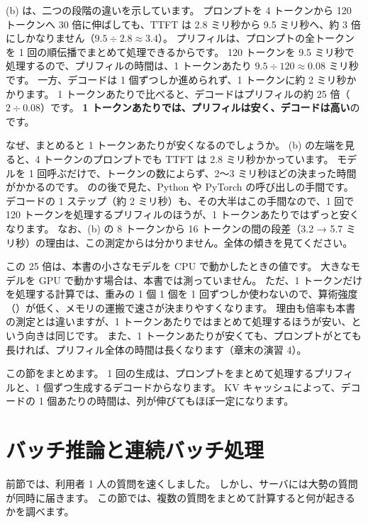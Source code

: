 (b) は、二つの段階の違いを示しています。
プロンプトを 4 トークンから 120 トークンへ 30 倍に伸ばしても、TTFT は 2.8 ミリ秒から 9.5 ミリ秒へ、約 3 倍にしかなりません（$9.5\div2.8\approx3.4$）。
プリフィルは、プロンプトの全トークンを 1 回の順伝播でまとめて処理できるからです。
120 トークンを 9.5 ミリ秒で処理するので、プリフィルの時間は、1 トークンあたり $9.5\div120\approx0.08$ ミリ秒です。
一方、デコードは 1 個ずつしか進められず、1 トークンに約 2 ミリ秒かかります。
1 トークンあたりで比べると、デコードはプリフィルの約 25 倍（$2\div0.08$）です。
\textbf{1 トークンあたりでは、プリフィルは安く、デコードは高い}のです。

なぜ、まとめると 1 トークンあたりが安くなるのでしょうか。
(b) の左端を見ると、4 トークンのプロンプトでも TTFT は 2.8 ミリ秒かかっています。
モデルを 1 回呼ぶだけで、トークンの数によらず、2〜3 ミリ秒ほどの決まった時間がかかるのです。
のの後で見た、Python や PyTorch の呼び出しの手間です。
デコードの 1 ステップ（約 2 ミリ秒）も、その大半はこの手間なので、1 回で 120 トークンを処理するプリフィルのほうが、1 トークンあたりではずっと安くなります。
なお、(b) の 8 トークンから 16 トークンの間の段差（3.2 → 5.7 ミリ秒）の理由は、この測定からは分かりません。全体の傾きを見てください。

この 25 倍は、本書の小さなモデルを CPU で動かしたときの値です。
大きなモデルを GPU で動かす場合は、本書では測っていません。
ただ、1 トークンだけを処理する計算では、重みの 1 個 1 個を 1 回ずつしか使わないので、算術強度（）が低く、メモリの運搬で速さが決まりやすくなります。
理由も倍率も本書の測定とは違いますが、1 トークンあたりではまとめて処理するほうが安い、という向きは同じです。
また、1 トークンあたりが安くても、プロンプトがとても長ければ、プリフィル全体の時間は長くなります（章末の演習 4）。

この節をまとめます。
1 回の生成は、プロンプトをまとめて処理するプリフィルと、1 個ずつ生成するデコードからなります。
KV キャッシュによって、デコードの 1 個あたりの時間は、列が伸びてもほぼ一定になります。

\section{バッチ推論と連続バッチ処理}\label{sec:es-batch}

前節では、利用者 1 人の質問を速くしました。
しかし、サーバには大勢の質問が同時に届きます。
この節では、複数の質問をまとめて計算すると何が起きるかを調べます。

